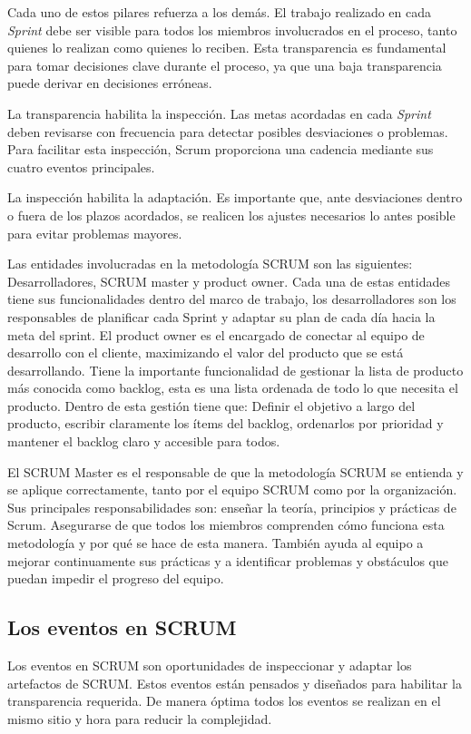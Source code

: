 Cada uno de estos pilares refuerza a los demás. El trabajo realizado en cada \textit{Sprint} debe ser visible para todos los miembros involucrados en el proceso, tanto quienes lo realizan como quienes lo reciben. Esta transparencia es fundamental para tomar decisiones clave durante el proceso, ya que una baja transparencia puede derivar en decisiones erróneas.

La transparencia habilita la inspección. Las metas acordadas en cada \textit{Sprint} deben revisarse con frecuencia para detectar posibles desviaciones o problemas. Para facilitar esta inspección, Scrum proporciona una cadencia mediante sus cuatro eventos principales.

La inspección habilita la adaptación. Es importante que, ante desviaciones dentro o fuera de los plazos acordados, se realicen los ajustes necesarios lo antes posible para evitar problemas mayores.

Las entidades involucradas en la metodología SCRUM son las siguientes: Desarrolladores, SCRUM master y product owner. Cada una de estas entidades tiene sus funcionalidades dentro del marco de trabajo, los desarrolladores son los responsables de planificar cada Sprint y adaptar su plan de cada día hacia la meta del sprint. El product owner es el encargado de conectar al equipo de desarrollo con el cliente, maximizando el valor del producto que se está desarrollando. Tiene la importante funcionalidad de gestionar la lista de producto más conocida como backlog, esta es una lista ordenada de todo lo que necesita el producto. Dentro de esta gestión tiene que: Definir el objetivo a largo del producto, escribir claramente los ítems del backlog, ordenarlos por prioridad y mantener el backlog claro y accesible para todos.

El SCRUM Master es el responsable de que la metodología SCRUM se entienda y se aplique correctamente, tanto por el equipo SCRUM como por la organización. Sus principales responsabilidades son: enseñar la teoría, principios y prácticas de Scrum. Asegurarse de que todos los miembros comprenden cómo funciona esta metodología y por qué se hace de esta manera. También ayuda al equipo a mejorar continuamente sus prácticas y a identificar problemas y obstáculos que puedan impedir el progreso del equipo.

\subsection{Los eventos en SCRUM}
Los eventos en SCRUM son oportunidades de inspeccionar y adaptar los artefactos de SCRUM. Estos eventos están pensados y diseñados para habilitar la transparencia requerida. De manera óptima todos los eventos se realizan en el mismo sitio y hora para reducir la complejidad.

